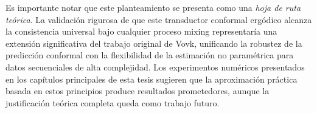 Es importante notar que este planteamiento se presenta como una \textit{hoja de ruta teórica}. La validación rigurosa de que este transductor conformal ergódico alcanza la consistencia universal bajo cualquier proceso mixing representaría una extensión significativa del trabajo original de Vovk, unificando la robustez de la predicción conformal con la flexibilidad de la estimación no paramétrica para datos secuenciales de alta complejidad. Los experimentos numéricos presentados en los capítulos principales de esta tesis sugieren que la aproximación práctica basada en estos principios produce resultados prometedores, aunque la justificación teórica completa queda como trabajo futuro.